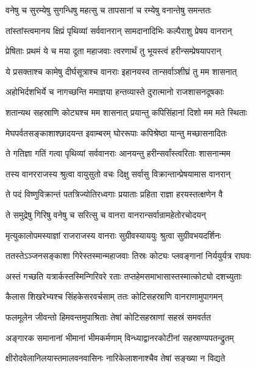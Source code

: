 \twolineshloka
{वनेषु च सुरम्येषु सुगन्धिषु महत्सु च}
{तापसानां च रम्येषु वनान्तेषु समन्ततः} %

\twolineshloka
{तांस्तांस्त्वमानय क्षिप्रं पृथिव्यां सर्ववानरान्}
{सामदानादिभिः कल्पैराशु प्रेषय वानरान्} %

\twolineshloka
{प्रेषिताः प्रथमं ये च मया दूता महाजवाः}
{त्वरणार्थं तु भूयस्त्वं हरीन्सम्प्रेषयापरान्} %

\twolineshloka
{ये प्रसक्ताश्च कामेषु दीर्घसूत्राश्च वानराः}
{इहानयस्व तान्सर्वाञ्शीघ्रं तु मम शासनात्} %

\twolineshloka
{अहोभिर्दशभिर्ये च नागच्छन्ति ममाज्ञया}
{हन्तव्यास्ते दुरात्मानो राजशासनदूषकाः} %

\twolineshloka
{शतान्यथ सहस्राणि कोट्यश्च मम शासनात्}
{प्रयान्तु कपिसिंहानां दिशो मम मते स्थिताः} %

\twolineshloka
{मेघपर्वतसङ्काशाश्छादयन्त इवाम्बरम्}
{घोररूपाः कपिश्रेष्ठा यान्तु मच्छासनादितः} %

\twolineshloka
{ते गतिज्ञा गतिं गत्वा पृथिव्यां सर्ववानराः}
{आनयन्तु हरीन्सर्वांस्त्वरिताः शासनान्मम} %

\twolineshloka
{तस्य वानरराजस्य श्रुत्वा वायुसुतो वचः}
{दिक्षु सर्वासु विक्रान्तान्प्रेषयामास वानरान्} %

\twolineshloka
{ते पदं विष्णुविक्रान्तं पतत्रिज्योतिरध्वगाः}
{प्रयाताः प्रहिता राज्ञा हरयस्तत्क्षणेन वै} %

\twolineshloka
{ते समुद्रेषु गिरिषु वनेषु च सरित्सु च}
{वानरा वानरान्सर्वान्रामहेतोरचोदयन्} %

\twolineshloka
{मृत्युकालोपमस्याज्ञां राजराजस्य वानराः}
{सुग्रीवस्याययुः श्रुत्वा सुग्रीवभयदर्शिनः} %

\twolineshloka
{ततस्तेऽञ्जनसङ्काशा गिरेस्तस्मान्महाजवाः}
{तिस्रः कोट्यः प्लवङ्गानां निर्ययुर्यत्र राघवः} %

\twolineshloka
{अस्तं गच्छति यत्रार्कस्तस्मिन्गिरिवरे रताः}
{तप्तहेमसमाभासास्तस्मात्कोट्यो दशच्युताः} %

\twolineshloka
{कैलास शिखरेभ्यश्च सिंहकेसरवर्चसाम्}
{ततः कोटिसहस्राणि वानराणामुपागमन्} %

\twolineshloka
{फलमूलेन जीवन्तो हिमवन्तमुपाश्रिताः}
{तेषां कोटिसहस्राणां सहस्रं समवर्तत} %

\twolineshloka
{अङ्गारक समानानां भीमानां भीमकर्मणाम्}
{विन्ध्याद्वानरकोटीनां सहस्राण्यपतन्द्रुतम्} %

\twolineshloka
{क्षीरोदवेलानिलयास्तमालवनवासिनः}
{नारिकेलाशनाश्चैव तेषां सङ्ख्या न विद्यते} %

